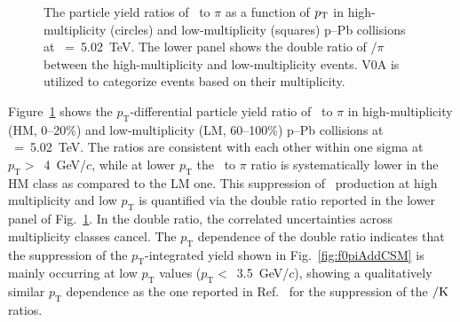 \begin{figure}[!hbt]
	\centering
	\caption{ The particle yield ratios of \fzero~to $\pi$ as a function of $p_{\rm{T}}$ in high-multiplicity (circles) and low-multiplicity (squares) p--Pb collisions at \snn~=~5.02~TeV. The lower panel shows the double ratio of \fzero/$\pi$ between the high-multiplicity and low-multiplicity events. V0A is utilized to categorize events based on their multiplicity.}
	\label{fig:f0piPt}
\end{figure}

Figure~\ref{fig:f0piPt} shows the $p_{\mathrm{T}}$-differential particle yield ratio of \fzero~to $\pi$ in high-multiplicity (HM, 0--20\%) and low-multiplicity (LM, 60--100\%) p--Pb collisions at \snn~=~5.02~TeV. The ratios are consistent with each other within one sigma at $p_{\mathrm{T}}>$~4~GeV/$c$, while at lower $p_{\mathrm{T}}$ the \fzero~to $\pi$ ratio is systematically lower in the HM class as compared to the LM one. This suppression of \fzero~production at high multiplicity and low $p_{\mathrm{T}}$ is quantified via the double ratio reported in the lower panel of Fig.~\ref{fig:f0piPt}. In the double ratio, the correlated uncertainties across multiplicity classes cancel. The $p_{\mathrm{T}}$ dependence of the double ratio indicates that the suppression of the $p_{\mathrm{T}}$-integrated yield shown in Fig.~\ref{fig:f0piAddCSM} is mainly occurring at low $p_{\mathrm{T}}$ values ($p_{\mathrm{T}}<$~3.5~GeV/$c$), showing a qualitatively similar $p_{\mathrm{T}}$ dependence as the one reported in Ref.~\cite{ALICE:2019etb} for the suppression of the \kstar$\rm{}/K$ ratios.

